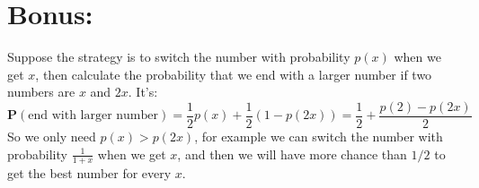 \documentclass[11pt]{article}
\begin{document}
\section*{\normalsize{Bonus:}}

Suppose the strategy is to switch the number with probability $p(x)$ when we get $x$,
then calculate the probability that we end with a larger number if two numbers are $x$ and $2x$.
It's:
$$\textbf{P}(\text{end with larger number}) = \frac{1}{2} p(x) + \frac{1}{2} \left( 1 - p(2x) \right) = \frac{1}{2} + \frac{p(2) - p(2x)}{2}$$
So we only need $p(x) > p(2x)$, for example we can switch the number with probability $\frac{1}{1+x}$ when we get $x$,
and then we will have more chance than $1/2$ to get the best number for every $x$.
\end{document}
